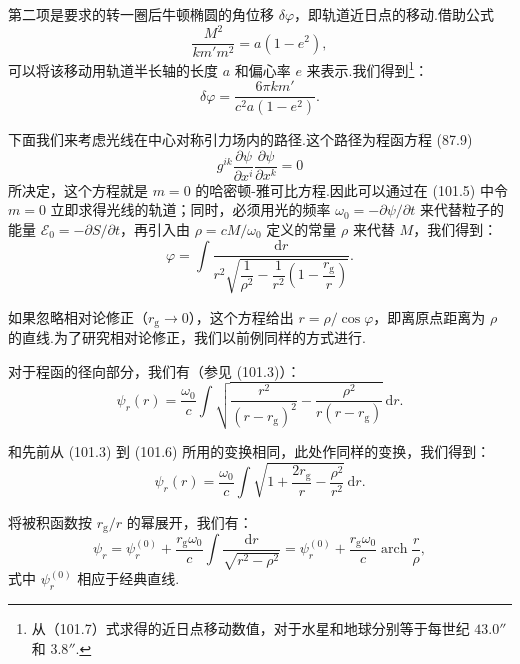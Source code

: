 第二项是要求的转一圈后牛顿椭圆的角位移 $\delta\varphi$，即轨道近日点的移动.借助公式
\begin{equation*}
  \frac{M^{2}}{km'm^{2}}=a(1-e^{2}),
\end{equation*}
可以将该移动用轨道半长轴的长度 $a$ 和偏心率 $e$ 来表示.我们得到\footnote{从（101.7）式求得的近日点移动数值，对于水星和地球分别等于每世纪 $43.0''$ 和 $3.8''$.}：
\begin{equation}
  \delta\varphi=\frac{6\pi km'}{c^{2}a(1-e^{2})}.
\end{equation}

下面我们来考虑光线在中心对称引力场内的路径.这个路径为程函方程 (87.9)
\begin{equation*}
  g^{ik}\frac{\partial\psi}{\partial x^{i}}
  \frac{\partial\psi}{\partial x^{k}}=0
\end{equation*}
所决定，这个方程就是 $m=0$ 的哈密顿-雅可比方程.因此可以通过在 (101.5) 中令 $m=0$ 立即求得光线的轨道；同时，必须用光的频率 $\omega_0=-\partial\psi/\partial t$ 来代替粒子的能量 $\mathcal{E}_0=-\partial S/\partial t$，再引入由 $\rho=cM/\omega_0$ 定义的常量 $\rho$ 来代替 $M$，我们得到：
\begin{equation}
  \varphi=\int\frac{\mathrm{d}r}
  {r^{2}\sqrt{\dfrac{1}{\rho^{2}}
  -\dfrac{1}{r^{2}}\left(1-\dfrac{r_{\mathrm{g}}}{r}\right)}}.
\end{equation}

如果忽略相对论修正（$r_{\mathrm{g}}\to0$），这个方程给出 $r=\rho/\cos\varphi$，即离原点距离为 $\rho$ 的直线.为了研究相对论修正，我们以前例同样的方式进行.

对于程函的径向部分，我们有（参见 (101.3)）：
\begin{equation*}
  \psi_r(r)=\frac{\omega_0}{c}\int
  \sqrt{\frac{r^{2}}{(r-r_{\mathrm{g}})^{2}}
  -\frac{\rho^{2}}{r(r-r_{\mathrm{g}})}}\,\mathrm{d}r.
\end{equation*}

和先前从 (101.3) 到 (101.6) 所用的变换相同，此处作同样的变换，我们得到：
\begin{equation*}
  \psi_r(r)=\frac{\omega_0}{c}\int
  \sqrt{1+\frac{2r_{\mathrm{g}}}{r}-\frac{\rho^{2}}{r^{2}}}\,\mathrm{d}r.
\end{equation*}

将被积函数按 $r_{\mathrm{g}}/r$ 的幂展开，我们有：
\begin{equation*}
  \psi_r=\psi_r^{(0)}+\frac{r_{\mathrm{g}}\omega_0}{c}
  \int\frac{\mathrm{d}r}{\sqrt{r^{2}-\rho^{2}}}
  =\psi_r^{(0)}+\frac{r_{\mathrm{g}}\omega_0}{c}
  \operatorname{arch}\frac{r}{\rho},
\end{equation*}
式中 $\psi_r^{(0)}$ 相应于经典直线.


